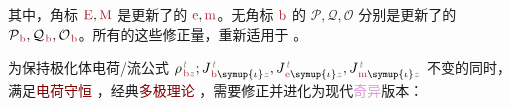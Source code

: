 其中，角标 $\textcolor{Maroon}{\text{E}},\textcolor{Maroon}{\text{M}}$ 是更新了的 $\textcolor{Maroon}{\text{e}},\textcolor{Maroon}{\text{m}}$。无角标 $\textcolor{Maroon}{\text{b}}$ 的 $\mathcal{P},\mathcal{Q},\mathcal{O}$ 分别是更新了的 $\mathcal{P}_{\;\!\textcolor{Maroon}{\text{b}}},\mathcal{Q}_{\;\!\textcolor{Maroon}{\text{b}}},\mathcal{O}_{\;\!\textcolor{Maroon}{\text{b}}}$。所有的这些修正量，重新适用于 。

为保持极化体电荷/流公式 ${\rho}^{\;\!\mathcolor{gray}{t}}_{\;\!\textcolor{Maroon}{\text{b}} \mathcolor{gray}{z}};{J}^{\;\!\mathcolor{gray}{t}}_{\;\!\textcolor{Maroon}{\text{b}} \symup{\iota} \mathcolor{gray}{z}},{J}^{\;\!\mathcolor{gray}{t}}_{\;\!\textcolor{Maroon}{\text{e}} \symup{\iota} \mathcolor{gray}{z}},{J}^{\;\!\mathcolor{gray}{t}}_{\;\!\textcolor{Maroon}{\text{m}} \symup{\iota} \mathcolor{gray}{z}}$ 不变的同时，满足\textcolor{Maroon}{电荷守恒} ，经典\textcolor{Maroon}{多极理论} ，需要修正并进化为现代\textcolor{Plum}{奇异}版本：
